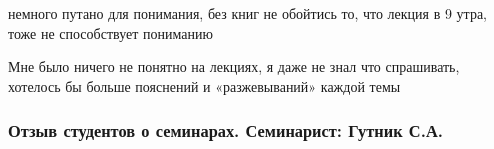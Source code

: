             \begin{commentbox} 
                немного путано для понимания, без книг не обойтись
                то, что лекция в 9 утра, тоже не способствует пониманию 
            \end{commentbox} 
        
            \begin{commentbox} 
                Мне было ничего не понятно на лекциях, я даже не знал что спрашивать, хотелось бы больше пояснений и «разжевываний» каждой темы 
            \end{commentbox} 
    
    
    \subsubsection{Отзыв студентов о семинарах. Семинарист: Гутник С.А.}
